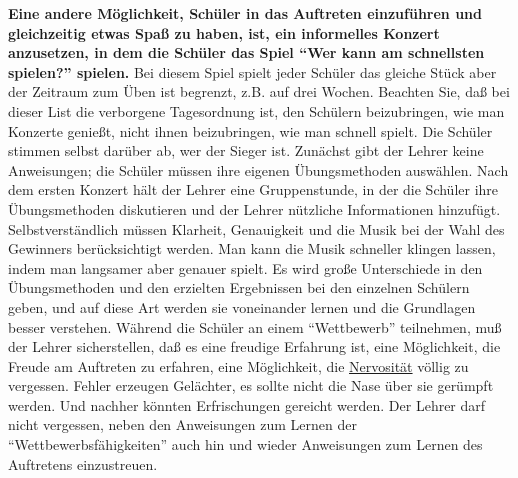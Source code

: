 \textbf{Eine andere Möglichkeit, Schüler in das Auftreten einzuführen und gleichzeitig etwas Spaß zu haben, ist, ein informelles Konzert anzusetzen, in dem die Schüler das Spiel \enquote{Wer kann am schnellsten spielen?} spielen.}
Bei diesem Spiel spielt jeder Schüler das gleiche Stück aber der Zeitraum zum Üben ist begrenzt, z.B. auf drei Wochen.
Beachten Sie, daß bei dieser List die verborgene Tagesordnung ist, den Schülern beizubringen, wie man Konzerte genießt, nicht ihnen beizubringen, wie man schnell spielt.
Die Schüler stimmen selbst darüber ab, wer der Sieger ist.
Zunächst gibt der Lehrer keine Anweisungen; die Schüler müssen ihre eigenen Übungsmethoden auswählen.
Nach dem ersten Konzert hält der Lehrer eine Gruppenstunde, in der die Schüler ihre Übungsmethoden diskutieren und der Lehrer nützliche Informationen hinzufügt.
Selbstverständlich müssen Klarheit, Genauigkeit und die Musik bei der Wahl des Gewinners berücksichtigt werden.
Man kann die Musik schneller klingen lassen, indem man langsamer aber genauer spielt.
Es wird große Unterschiede in den Übungsmethoden und den erzielten Ergebnissen bei den einzelnen Schülern geben, und auf diese Art werden sie voneinander lernen und die Grundlagen besser verstehen.
Während die Schüler an einem \enquote{Wettbewerb} teilnehmen, muß der Lehrer sicherstellen, daß es eine freudige Erfahrung ist, eine Möglichkeit, die Freude am Auftreten zu erfahren, eine Möglichkeit, die \hyperref[c1iii15]{Nervosität} völlig zu vergessen.
Fehler erzeugen Gelächter, es sollte nicht die Nase über sie gerümpft werden.
Und nachher könnten Erfrischungen gereicht werden.
Der Lehrer darf nicht vergessen, neben den Anweisungen zum Lernen der \enquote{Wettbewerbsfähigkeiten} auch hin und wieder Anweisungen zum Lernen des Auftretens einzustreuen.

